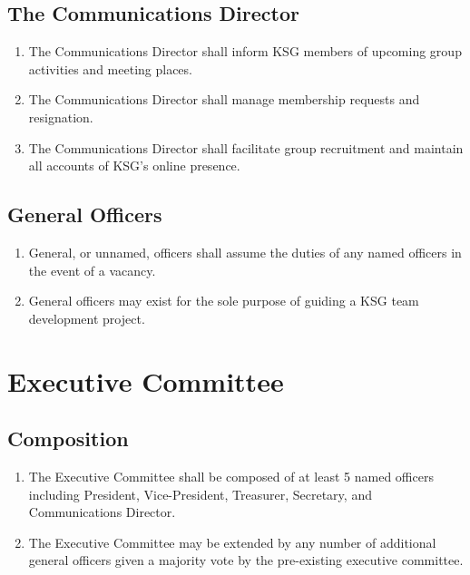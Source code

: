 \documentclass[12pt,executivepaper]{article}
\begin{document}
\subsection{The Communications Director}
\begin{enumerate}
    \item The Communications Director shall inform KSG members of upcoming group activities
          and meeting places.
    \item The Communications Director shall manage membership requests and resignation.
    \item The Communications Director shall facilitate group recruitment and maintain all
          accounts of KSG's online presence.
\end{enumerate}

\subsection{General Officers}
\begin{enumerate}
    \item General, or unnamed, officers shall assume the duties of any named officers in
          the event of a vacancy.
    \item General officers may exist for the sole purpose of guiding a KSG team development
          project.
\end{enumerate}

\section{Executive Committee}

\subsection{Composition}
\begin{enumerate}
    \item The Executive Committee shall be composed of at least 5 named officers including
          President, Vice-President, Treasurer, Secretary, and Communications Director. 
    \item The Executive Committee may be extended by any number of additional general officers
          given a majority vote by the pre-existing executive committee.
\end{enumerate}
\end{document}
